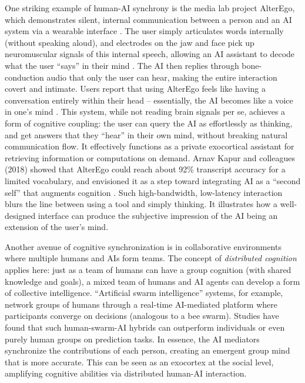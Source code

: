 \documentclass[11pt]{article}
\newcommand{\quotes}[1]{``#1''}
\begin{document}
One striking example of human-AI synchrony is the media lab project AlterEgo, which demonstrates silent, internal communication between a person and an AI system via a wearable interface \cite{Kapur2018}. The user simply articulates words internally (without speaking aloud), and electrodes on the jaw and face pick up neuromuscular signals of this internal speech, allowing an AI assistant to decode what the user \quotes{says} in their mind \cite{Kapur2018}. The AI then replies through bone-conduction audio that only the user can hear, making the entire interaction covert and intimate. Users report that using AlterEgo feels like having a conversation entirely within their head -- essentially, the AI becomes like a voice in one's mind \cite{Kapur2018}. This system, while not reading brain signals per se, achieves a form of cognitive coupling: the user can query the AI as effortlessly as thinking, and get answers that they \quotes{hear} in their own mind, without breaking natural communication flow. It effectively functions as a private exocortical assistant for retrieving information or computations on demand. Arnav Kapur and colleagues (2018) showed that AlterEgo could reach about 92\% transcript accuracy for a limited vocabulary, and envisioned it as a step toward integrating AI as a \quotes{second self} that augments cognition \cite{Kapur2018}. Such high-bandwidth, low-latency interaction blurs the line between using a tool and simply thinking. It illustrates how a well-designed interface can produce the subjective impression of the AI being an extension of the user's mind.

Another avenue of cognitive synchronization is in collaborative environments where multiple humans and AIs form teams. The concept of \textit{distributed cognition} applies here: just as a team of humans can have a group cognition (with shared knowledge and goals), a mixed team of humans and AI agents can develop a form of collective intelligence. \quotes{Artificial swarm intelligence} systems, for example, network groups of humans through a real-time AI-mediated platform where participants converge on decisions (analogous to a bee swarm). Studies have found that such human-swarm-AI hybrids can outperform individuals or even purely human groups on prediction tasks. In essence, the AI mediators synchronize the contributions of each person, creating an emergent group mind that is more accurate. This can be seen as an exocortex at the social level, amplifying cognitive abilities via distributed human-AI interaction.
\end{document}
